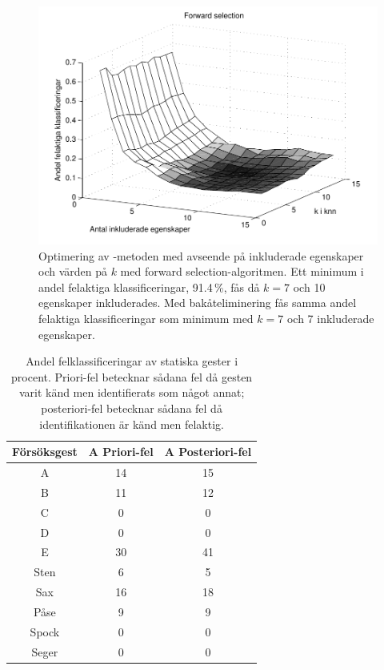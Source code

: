 \documentclass[../rapport_MVEX01-11-05]{subfiles}
\begin{document}
\begin{figure}[tbp]
    \begin{center}
        \includegraphics[width=0.5\columnwidth,clip=true]{bilder/fwd_sel}
    \end{center}
    \caption{Optimering av \knn-metoden med avseende på inkluderade egenskaper
och värden på $k$ med forward selection-algoritmen. Ett minimum i
andel felaktiga klassificeringar, 91.4\,\%, fås då
$k=7$ och 10 egenskaper inkluderades. Med bakåteliminering fås
samma andel felaktiga klassificeringar som minimum med $k=7$ och 7 inkluderade egenskaper.}
    \label{fig:knn-optimering}
\end{figure}



\begin{table}[tbp]
	\centering
	\caption{Andel felklassificeringar av statiska gester i procent. Priori-fel
	betecknar sådana fel då gesten varit känd men identifierats
	som något annat; posteriori-fel betecknar sådana fel då
	identifikationen är känd men felaktig. }
	\smallskip
	\label{tab:prestanda}
	\begin{tabular}{c c c}
		\toprule 
		Försöksgest & A Priori-fel & A Posteriori-fel \\
		\midrule 
		A & 14&15 \\
		B & 11&12 \\
		C & 0& 0\\
		D & 0& 0\\
		E & 30& 41\\
		Sten & 6& 5\\
		Sax & 16& 18\\
		Påse & 9& 9\\
		Spock & 0& 0\\
		Seger & 0& 0\\
		\bottomrule 
	\end{tabular}
\end{table}
\end{document}
